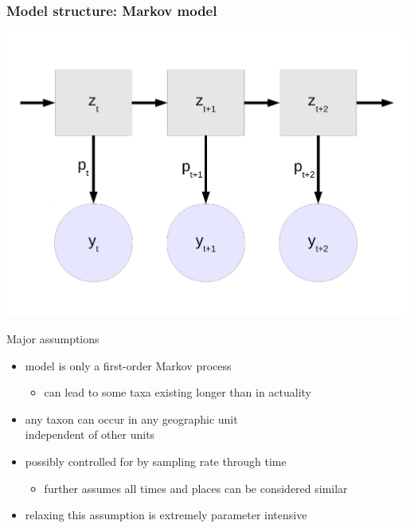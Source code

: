 \documentclass{beamer}
\begin{document}
\begin{frame}
  \frametitle{Model structure: Markov model}
  \begin{center}
    \includegraphics[width=\textwidth,height=0.8\textheight,keepaspectratio=true]{figure/hidden_state}
  \end{center}
\end{frame}


\begin{frame}
  \begin{block}{Major assumptions}
    \begin{itemize}
      \item model is only a first-order Markov process
        \begin{itemize}
          \item can lead to some taxa existing longer than in actuality
        \end{itemize}
      \item any taxon can occur in any geographic unit \\independent of other units
      \item possibly controlled for by sampling rate through time
        \begin{itemize}
          \item further assumes all times and places can be considered similar
        \end{itemize}
      \item relaxing this assumption is extremely parameter intensive
    \end{itemize}
  \end{block}
\end{frame}
\end{document}
